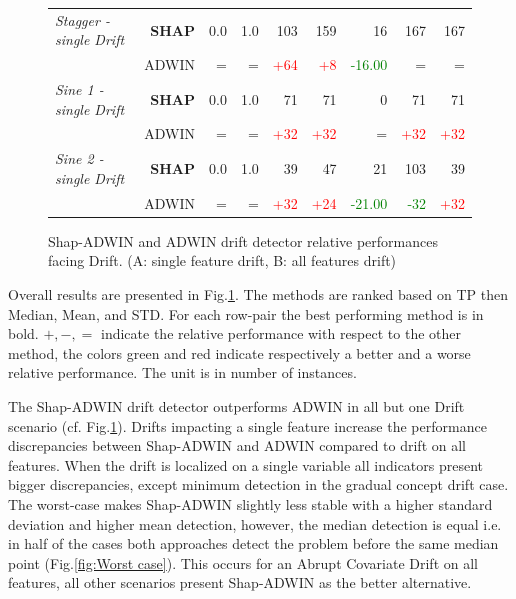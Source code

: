 \documentclass[runningheads]{llncs}
\begin{document}
\begin{figure}[htbp]
\begin{center}
\begin{tabular}{|l|r|r|r|r|r|r|r|r|}
 \textit{Stagger - single Drift} & \textbf{SHAP} &  0.0 &  1.0 &                  103 &                 159 &                        16 &  167 &    167 \\ \cline{2-9} {} & ADWIN & =\; & =\; &  \textcolor{red}{+64} &  \textcolor{red}{+8} &  \textcolor{green}{-16.00} & =\; &   =\; \\ \hline
 \textit{Sine 1 - single Drift} & \textbf{SHAP} &  0.0 &  1.0 &                   71 &                   71 &    0 &                   71 &                   71 \\ \cline{2-9} {} & ADWIN & =\; & =\; &  \textcolor{red}{+32} &  \textcolor{red}{+32} & =\; &  \textcolor{red}{+32} &  \textcolor{red}{+32} \\ \hline
 \textit{Sine 2 - single Drift} & \textbf{SHAP} &  0.0 &  1.0 &                   39 &                   47 &                        21 &                    103 &                   39 \\ \cline{2-9} {} & ADWIN & =\; & =\; &  \textcolor{red}{+32} &  \textcolor{red}{+24} &  \textcolor{green}{-21.00} &  \textcolor{green}{-32} &  \textcolor{red}{+32} \\ \hline


    \end{tabular}
 \caption{\label{tab:Table 1}Shap-ADWIN and ADWIN drift detector relative performances facing Drift.
 (A: single feature drift, B: all features drift)}
\end{center}
\end{figure}

\vspace{10pt}

Overall results are presented in Fig.\ref{tab:Table 1}.
The methods are ranked based on TP then Median, Mean, and STD. For each row-pair the best performing method is in bold. $+, -, =$ indicate the relative performance with respect to the other method, the colors green and red indicate respectively a better and a worse relative performance. The unit is in number of instances. 

The Shap-ADWIN drift detector outperforms ADWIN in all but one Drift scenario (cf. Fig.\ref{tab:Table 1}). 
Drifts impacting a single feature increase the performance discrepancies between Shap-ADWIN and ADWIN compared to drift on all features. When the drift is localized on a single variable all indicators present bigger discrepancies, except minimum detection in the gradual concept drift case.
The worst-case makes Shap-ADWIN slightly less stable with a higher standard deviation and higher mean detection, however, the median detection is equal i.e. in half of the cases both approaches detect the problem before the same median point (Fig.\ref{fig:Worst case}). This occurs for an Abrupt Covariate Drift on all features, all other scenarios present Shap-ADWIN as the better alternative.
\end{document}

